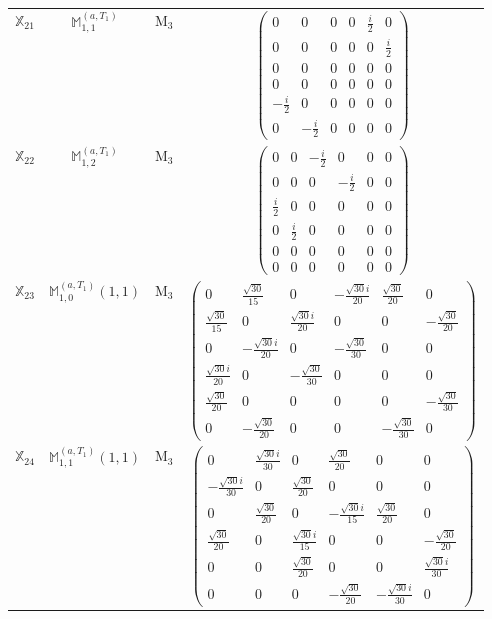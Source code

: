\documentclass[fleqn,10pt,landscape]{article}
\begin{document}
\begin{itemize}
\begin{center}
\begin{longtable}{c|c|c|c}
$ \mathbb{X}_{21} $ & $\mathbb{M}_{1,1}^{(a,T_{1})}$ & M$_{3}$ & $\begin{pmatrix} 0 & 0 & 0 & 0 & \frac{i}{2} & 0 \\ 0 & 0 & 0 & 0 & 0 & \frac{i}{2} \\ 0 & 0 & 0 & 0 & 0 & 0 \\ 0 & 0 & 0 & 0 & 0 & 0 \\ - \frac{i}{2} & 0 & 0 & 0 & 0 & 0 \\ 0 & - \frac{i}{2} & 0 & 0 & 0 & 0 \end{pmatrix}$ \\
$ \mathbb{X}_{22} $ & $\mathbb{M}_{1,2}^{(a,T_{1})}$ & M$_{3}$ & $\begin{pmatrix} 0 & 0 & - \frac{i}{2} & 0 & 0 & 0 \\ 0 & 0 & 0 & - \frac{i}{2} & 0 & 0 \\ \frac{i}{2} & 0 & 0 & 0 & 0 & 0 \\ 0 & \frac{i}{2} & 0 & 0 & 0 & 0 \\ 0 & 0 & 0 & 0 & 0 & 0 \\ 0 & 0 & 0 & 0 & 0 & 0 \end{pmatrix}$ \\
$ \mathbb{X}_{23} $ & $\mathbb{M}_{1,0}^{(a,T_{1})}(1,1)$ & M$_{3}$ & $\begin{pmatrix} 0 & \frac{\sqrt{30}}{15} & 0 & - \frac{\sqrt{30} i}{20} & \frac{\sqrt{30}}{20} & 0 \\ \frac{\sqrt{30}}{15} & 0 & \frac{\sqrt{30} i}{20} & 0 & 0 & - \frac{\sqrt{30}}{20} \\ 0 & - \frac{\sqrt{30} i}{20} & 0 & - \frac{\sqrt{30}}{30} & 0 & 0 \\ \frac{\sqrt{30} i}{20} & 0 & - \frac{\sqrt{30}}{30} & 0 & 0 & 0 \\ \frac{\sqrt{30}}{20} & 0 & 0 & 0 & 0 & - \frac{\sqrt{30}}{30} \\ 0 & - \frac{\sqrt{30}}{20} & 0 & 0 & - \frac{\sqrt{30}}{30} & 0 \end{pmatrix}$ \\
$ \mathbb{X}_{24} $ & $\mathbb{M}_{1,1}^{(a,T_{1})}(1,1)$ & M$_{3}$ & $\begin{pmatrix} 0 & \frac{\sqrt{30} i}{30} & 0 & \frac{\sqrt{30}}{20} & 0 & 0 \\ - \frac{\sqrt{30} i}{30} & 0 & \frac{\sqrt{30}}{20} & 0 & 0 & 0 \\ 0 & \frac{\sqrt{30}}{20} & 0 & - \frac{\sqrt{30} i}{15} & \frac{\sqrt{30}}{20} & 0 \\ \frac{\sqrt{30}}{20} & 0 & \frac{\sqrt{30} i}{15} & 0 & 0 & - \frac{\sqrt{30}}{20} \\ 0 & 0 & \frac{\sqrt{30}}{20} & 0 & 0 & \frac{\sqrt{30} i}{30} \\ 0 & 0 & 0 & - \frac{\sqrt{30}}{20} & - \frac{\sqrt{30} i}{30} & 0 \end{pmatrix}$ \\

\end{longtable}
\end{center}
\end{itemize}
\end{document}
